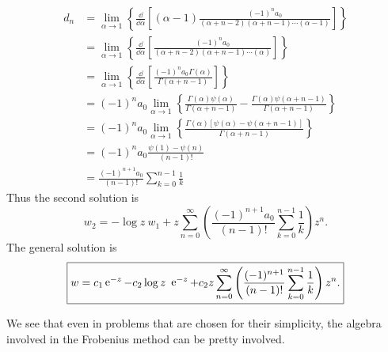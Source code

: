 \begin{Example}
  \begin{align*}
    d_n     &= \lim_{\alpha \to 1} \left\{
      \frac{\dd}{\dd \alpha} \left[(\alpha-1)
        \frac{(-1)^n a_0 }{(\alpha+n-2)(\alpha+n-1)\cdots(\alpha-1) }\right] 
    \right\} \\
    &= \lim_{\alpha \to 1} \left\{
      \frac{\dd}{\dd \alpha} \left[\frac{(-1)^n a_0 }{(\alpha+n-2)(\alpha+n-1)
          \cdots(\alpha)}\right]\right\} \\
    &= \lim_{\alpha \to 1} \left\{
      \frac{\dd}{\dd \alpha} \left[\frac{(-1)^n a_0 \Gamma(\alpha)}
        {\Gamma(\alpha+n-1)} \right] \right\} \\
    &= (-1)^n a_0 \lim_{\alpha \to 1} \left\{ \frac{\Gamma(\alpha)
        \psi(\alpha)}{\Gamma(\alpha+n-1)} - \frac{\Gamma(\alpha)
        \psi(\alpha+n-1)}{\Gamma(\alpha+n-1)} \right\} \\
    &= (-1)^n a_0 \lim_{\alpha \to 1} \left\{ \frac{\Gamma(\alpha)
        [\psi(\alpha)-\psi(\alpha+n-1)]}{\Gamma(\alpha+n-1)} \right\} \\
    &= (-1)^n a_0 \frac{\psi(1) - \psi(n)}{(n-1)!} \\
    &= \frac{(-1)^{n+1} a_0}{(n-1)!} \sum_{k=0}^{n-1} \frac{1}{k}
  \end{align*}
  Thus the second solution is
  \[ \boxed{ w_2 = -\log z\ w_1 + z \sum_{n=0}^\infty \left( \frac{(-1)^{n+1} a_0}
      {(n-1)!} \sum_{k=0}^{n-1} \frac{1}{k}\right) z^n.} \]
  The general solution is
  \[ \boxed{ w = c_1 \mathop{\mathrm{e}}\nolimits^{-z} - c_2 \log z\ \mathop{\mathrm{e}}\nolimits^{-z} + c_2 
    z \sum_{n=0}^\infty \left( \frac{(-1)^{n+1} }
      {(n-1)!} \sum_{k=0}^{n-1} \frac{1}{k}\right) z^n. } \]
\end{Example}


We see that even in problems that are chosen for their simplicity, the algebra
involved in the Frobenius method can be pretty involved.







